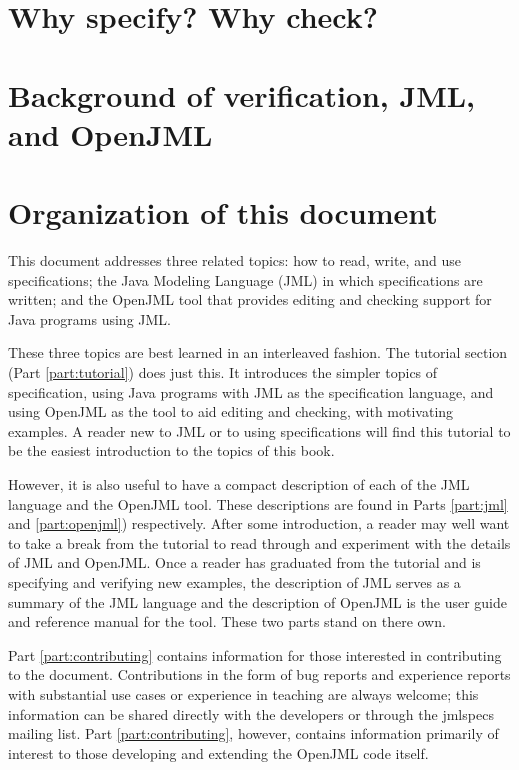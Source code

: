 \chapter{Why specify? Why check?}

\chapter{Background of verification, JML, and OpenJML}

\chapter{Organization of this document}

This document addresses three related topics: how to read, write, and use specifications; the Java Modeling Language (JML) in which specifications are written; and the OpenJML tool that provides editing and checking support for Java programs using JML. 

These three topics are best learned in an interleaved fashion. The tutorial section (Part \ref{part:tutorial}) does just this. It introduces the simpler topics of specification, using Java programs with JML as the specification language, and using OpenJML as the tool to aid editing and checking, with motivating examples. A reader new to JML or to using specifications will find this tutorial to be the easiest introduction to the topics of this book. 

However, it is also useful to have a compact description of each of the JML language and the OpenJML tool. These descriptions are found in Parts \ref{part:jml} and \ref{part:openjml}) respectively. After some introduction, a reader may well want to 
take a break from the tutorial to read through and experiment with the details of JML and OpenJML. Once a reader has graduated from the tutorial and is specifying and verifying new examples, the description of JML serves as a summary of the JML language and the description of OpenJML is the user guide and reference manual for the tool. These two parts stand on there own.

Part \ref{part:contributing} contains information for those interested in contributing to the document. 
Contributions in the form of bug reports and experience reports with substantial use cases or experience in teaching are always welcome; this information can be shared directly with the developers or through the jmlspecs mailing list. 
Part \ref{part:contributing}, however, contains information primarily of interest to those developing and extending the OpenJML code itself.

